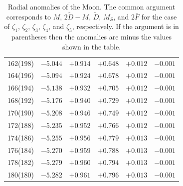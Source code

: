 \begin{table}[!h]
\begin{tabular}{rrrrrr}
  162(198) & $-5.044$ & $+0.914$ & $+0.648$ & $+0.012$ & $-0.001$\\
  164(196) & $-5.094$ & $+0.924$ & $+0.678$ & $+0.012$ & $-0.001$\\
  166(194) & $-5.138$ & $+0.932$ & $+0.705$ & $+0.012$ & $-0.001$\\
  168(192) & $-5.176$ & $+0.940$ & $+0.729$ & $+0.012$ & $-0.001$\\
  170(190) & $-5.208$ & $+0.946$ & $+0.749$ & $+0.012$ & $-0.001$\\
  172(188) & $-5.235$ & $+0.952$ & $+0.766$ & $+0.012$ & $-0.001$\\
  174(186) & $-5.255$ & $+0.956$ & $+0.779$ & $+0.013$ & $-0.001$\\
  176(184) & $-5.270$ & $+0.959$ & $+0.788$ & $+0.013$ & $-0.001$\\
   178(182) & $-5.279$ & $+0.960$ & $+0.794$ & $+0.013$ & $-0.001$\\
   180(180) & $-5.282$ & $+0.961$ & $+0.796$ & $+0.013$ & $-0.001$\\
\end{tabular}
\caption{Radial anomalies of the Moon. The common argument corresponds to
$M$, $2\tilde{D}-M$, $\tilde{D}$, $M_S$, and $2\bar{F}$ for the case of
$\zeta_1$, $\zeta_2$, $\zeta_3$, $\zeta_4$, and $\zeta_5$, respectively. If the argument is
in parentheses then the anomalies are minus the values shown
in the table. }\label{tmoonaa}
\end{table}




